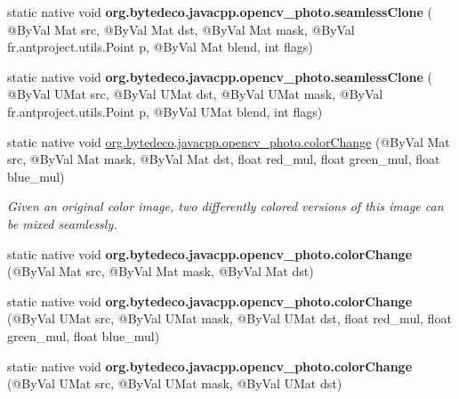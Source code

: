 \begin{DoxyCompactItemize}
\item 
\mbox{\label{group__photo__clone_ga38e8a5ac80ca104670989b92ccd186d0}} 
static native void {\bfseries org.\+bytedeco.\+javacpp.\+opencv\+\_\+photo.\+seamless\+Clone} ( @By\+Val Mat src, @By\+Val Mat dst, @By\+Val Mat mask, @By\+Val fr.antproject.utils.Point p, @By\+Val Mat blend, int flags)
\item 
\mbox{\label{group__photo__clone_gaab8f80a1d64b87472f8b1ef27a00f6c3}} 
static native void {\bfseries org.\+bytedeco.\+javacpp.\+opencv\+\_\+photo.\+seamless\+Clone} ( @By\+Val U\+Mat src, @By\+Val U\+Mat dst, @By\+Val U\+Mat mask, @By\+Val fr.antproject.utils.Point p, @By\+Val U\+Mat blend, int flags)
\item 
static native void \hyperlink{group__photo__clone_ga3560d162cd540795fe14ae7e98a7a9a2}{org.\+bytedeco.\+javacpp.\+opencv\+\_\+photo.\+color\+Change} (@By\+Val Mat src, @By\+Val Mat mask, @By\+Val Mat dst, float red\+\_\+mul, float green\+\_\+mul, float blue\+\_\+mul)
\begin{DoxyCompactList}\small\item\em Given an original color image, two differently colored versions of this image can be mixed seamlessly. \end{DoxyCompactList}\item 
\mbox{\label{group__photo__clone_gaa4b91919bc9f1d3fb46484378c671177}} 
static native void {\bfseries org.\+bytedeco.\+javacpp.\+opencv\+\_\+photo.\+color\+Change} (@By\+Val Mat src, @By\+Val Mat mask, @By\+Val Mat dst)
\item 
\mbox{\label{group__photo__clone_gad63db0b17e85ef38d4ba96a4a3b7b445}} 
static native void {\bfseries org.\+bytedeco.\+javacpp.\+opencv\+\_\+photo.\+color\+Change} (@By\+Val U\+Mat src, @By\+Val U\+Mat mask, @By\+Val U\+Mat dst, float red\+\_\+mul, float green\+\_\+mul, float blue\+\_\+mul)
\item 
\mbox{\label{group__photo__clone_ga7e00877486ea530a45652426586f47d7}} 
static native void {\bfseries org.\+bytedeco.\+javacpp.\+opencv\+\_\+photo.\+color\+Change} (@By\+Val U\+Mat src, @By\+Val U\+Mat mask, @By\+Val U\+Mat dst)
\item 

\end{DoxyCompactItemize}
